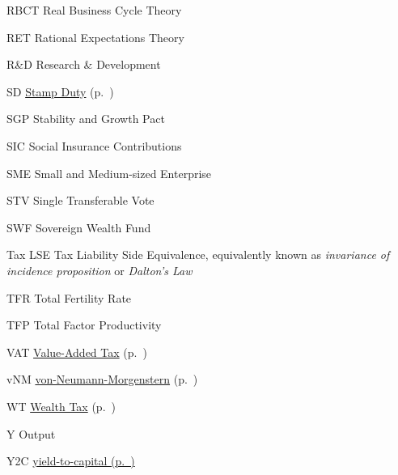 	{RBCT}
	{Real Business Cycle Theory}

	{RET}
	{Rational Expectations Theory}

	{R\&D}
	{Research \& Development}

	{SD}
	{\hyperref[sec:WT]{Stamp Duty} (p.~\pageref{sec:WT})}

	{SGP}
	{Stability and Growth Pact}

	{SIC}
	{Social Insurance Contributions}

	{SME}
	{Small and Medium-sized Enterprise}

	{STV}
	{Single Transferable Vote}

	{SWF}
	{Sovereign Wealth Fund}

	{Tax LSE}
	{Tax Liability Side Equivalence, equivalently known as \emph{invariance of incidence proposition} or \emph{Dalton's Law}}

	{TFR}
	{Total Fertility Rate}

	{TFP}
	{Total Factor Productivity}

	{VAT}
	{\hyperref[sec:VAT]{Value-Added Tax} (p.~\pageref{sec:VAT})}

	{vNM}
	{\hyperref[sec:rational] {von-Neumann-Morgenstern} (p.~\pageref{sec:rational})}

	{WT}
	{\hyperref[sec:WT]{Wealth Tax} (p.~\pageref{sec:WT})}

	{Y}
	{Output}

	{Y2C}
	{\hyperref[sec:Y2C]{yield-to-capital (p.~\pageref{sec:Y2C})}}